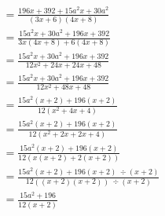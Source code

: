 \documentclass{article}
\begin{document}
\begin{description}
$$\begin{aligned}
                 & = \frac{196x+392 + 15a^2x + 30a^2}{(3x+6)(4x+8)}                       \\
                 & = \frac{15a^2x + 30a^2 + 196x + 392}{3x(4x+8)+6(4x+8)}                 \\
                 & = \frac{15a^2x + 30a^2 + 196x + 392}{12x^2+24x+24x+48}                 \\
                 & = \frac{15a^2x + 30a^2 + 196x + 392}{12x^2+48x+48}                     \\
                 & = \frac{15a^2(x+2)+196(x+2)}{12(x^2+4x+4)}                             \\
                 & = \frac{15a^2(x+2)+196(x+2)}{12(x^2+2x+2x+4)}                          \\
                 & = \frac{15a^2(x+2)+196(x+2)}{12(x(x+2)+2(x+2))}                        \\
                 & = \frac{15a^2(x+2)+196(x+2) \ \div (x+2)}{12((x+2)(x+2)) \ \div (x+2)} \\
                 & = \frac{15a^2 + 196}{12(x+2)}                                          \\
            \end{aligned}
        $$
\end{description}
\end{document}
